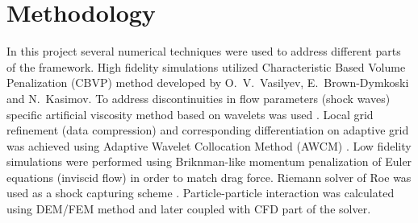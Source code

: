 \section{Methodology}
In this project several numerical techniques were used to address different parts of the framework. High fidelity simulations utilized Characteristic Based Volume Penalization (CBVP) method developed by O.~V.~Vasilyev, E.~Brown-Dymkoski and N.~Kasimov. To address discontinuities in flow parameters (shock waves) specific artificial viscosity method based on wavelets was used \cite{lib:RegVas}. Local grid refinement (data compression) and corresponding differentiation on adaptive grid was achieved using Adaptive Wavelet Collocation Method (AWCM) \cite{lib:wlt_main}. Low fidelity simulations were performed using Briknman-like momentum penalization of Euler equations (inviscid flow) in order to match drag force. Riemann solver of Roe was used as a shock capturing scheme \cite{book:Toro}. Particle-particle interaction was calculated using DEM/FEM method and later coupled with CFD part of the solver.
